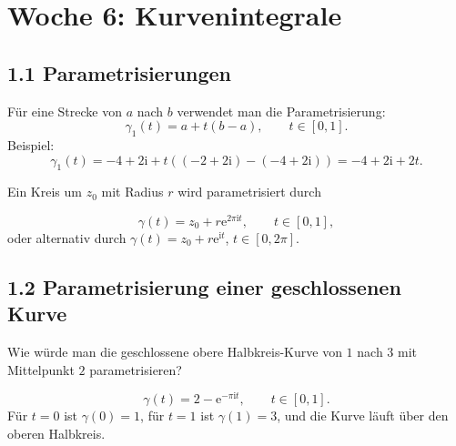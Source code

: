 \documentclass[11pt,a4paper]{article}
\newcommand{\ii}{\mathrm i}
\newcommand{\ee}{\mathrm e}
\begin{document}
\section{Woche 6: Kurvenintegrale}

\subsection{1.1 Parametrisierungen}
Für eine Strecke von $a$ nach $b$ verwendet man die Parametrisierung:
\[
\gamma_1(t)=a+t(b-a),\qquad t\in[0,1].
\]
Beispiel:
\[
\gamma_1(t)=-4+2\ii+t((-2+2\ii)-(-4+2\ii))=-4+2\ii+2t.
\]

Ein Kreis um $z_0$ mit Radius $r$ wird parametrisiert durch
\begin{importantbox}
\[
\gamma(t)=z_0+r\ee^{2\pi\ii t},\qquad t\in[0,1],
\]
oder alternativ durch $\gamma(t)=z_0+r\ee^{\ii t}$, $t\in[0,2\pi]$.
\end{importantbox}

\begin{center}
\end{center}

\subsection{1.2 Parametrisierung einer geschlossenen Kurve}
\begin{fragebox}
Wie würde man die geschlossene obere Halbkreis-Kurve von $1$ nach $3$ mit Mittelpunkt $2$ parametrisieren?
\end{fragebox}
\begin{antwortbox}
\[
\gamma(t)=2-\ee^{-\pi\ii t},\qquad t\in[0,1].
\]
Für $t=0$ ist $\gamma(0)=1$, für $t=1$ ist $\gamma(1)=3$, und die Kurve läuft über den oberen Halbkreis.
\end{antwortbox}

\begin{center}
\end{center}
\end{document}
